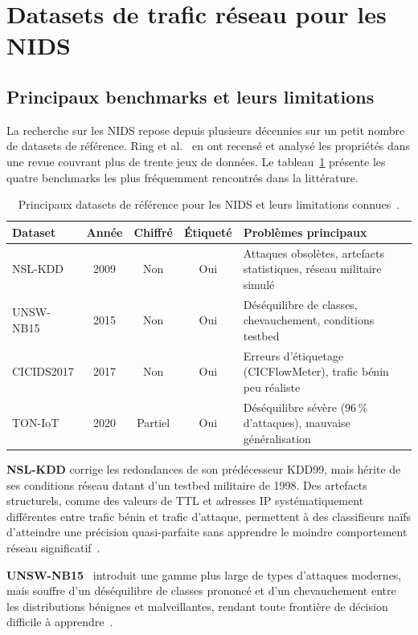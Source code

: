 \documentclass[12pt, a4paper]{report}
\begin{document}
\section{Datasets de trafic réseau pour les NIDS}
 
\subsection{Principaux benchmarks et leurs limitations}
 
La recherche sur les NIDS repose depuis plusieurs décennies sur un petit nombre de datasets de
référence. Ring et al.~\cite{ring2019} en ont recensé et analysé les propriétés dans une revue
couvrant plus de trente jeux de données. Le tableau~\ref{tab:datasets} présente les quatre benchmarks
les plus fréquemment rencontrés dans la littérature.
 
\begin{table}[H]
\centering
\caption{Principaux datasets de référence pour les NIDS et leurs limitations connues~\cite{survey2025}.}
\label{tab:datasets}
\small
\begin{tabular}{lcccp{5.7cm}}
\toprule
\textbf{Dataset} & \textbf{Année} & \textbf{Chiffré} & \textbf{Étiqueté} & \textbf{Problèmes principaux} \\
\midrule
NSL-KDD    & 2009 & Non     & Oui & Attaques obsolètes, artefacts statistiques, réseau militaire simulé \\
UNSW-NB15  & 2015 & Non     & Oui & Déséquilibre de classes, chevauchement, conditions testbed \\
CICIDS2017 & 2017 & Non     & Oui & Erreurs d'étiquetage (CICFlowMeter), trafic bénin peu réaliste \\
TON-IoT    & 2020 & Partiel & Oui & Déséquilibre sévère (96\,\% d'attaques), mauvaise généralisation \\
\bottomrule
\end{tabular}
\end{table}
 
\textbf{NSL-KDD} corrige les redondances de son prédécesseur KDD99, mais hérite de ses conditions
réseau datant d'un testbed militaire de 1998. Des artefacts structurels, comme des valeurs de TTL et adresses IP systématiquement différentes entre trafic bénin et trafic d'attaque, permettent à des classifieurs naïfs d'atteindre une précision quasi-parfaite sans apprendre le moindre comportement réseau
significatif~\cite{survey2025}.
 
\textbf{UNSW-NB15}~\cite{moustafa2015} introduit une gamme plus large de types d'attaques modernes,
mais souffre d'un déséquilibre de classes prononcé et d'un chevauchement entre les distributions
bénignes et malveillantes, rendant toute frontière de décision difficile à apprendre~\cite{zoghi2024}.
 
\end{document}
